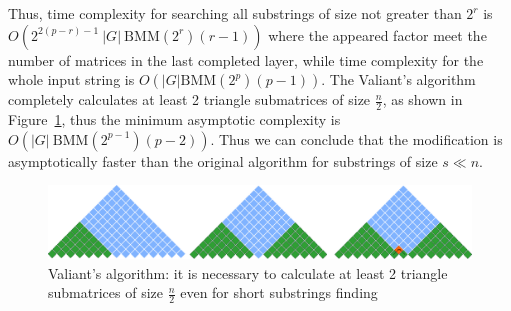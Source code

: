 Thus, time complexity for searching all substrings of size not greater than $2^{r}$ is $O(2^{2(p - r) - 1} \ |G| \ \mathrm{BMM}(2^{r})(r - 1))$ where the appeared factor meet the number of matrices in the last completed layer, while time complexity for the whole input string is $O(|G|\mathrm{BMM}(2^p)(p - 1))$. 
The Valiant's algorithm completely calculates at least 2 triangle submatrices of size $\frac{n}{2}$, as shown in Figure~\ref{fig5}, thus the minimum asymptotic complexity is $O(|G| \ \mathrm{BMM}(2^{p - 1})(p - 2))$.
Thus we can conclude that the modification is asymptotically faster than the original algorithm for substrings of size $s \ll n$.

\begin{figure}
\vspace{3mm}
 \begin{center}
 \includegraphics[width=12cm]{pictures/valsubstring.pdf}
    \caption{Valiant's algorithm: it is necessary to calculate at least 2 triangle submatrices of size $\frac{n}{2}$ even for short substrings finding}
    \label{fig5}
 \end{center}
\vspace{-8mm}
\end{figure}
